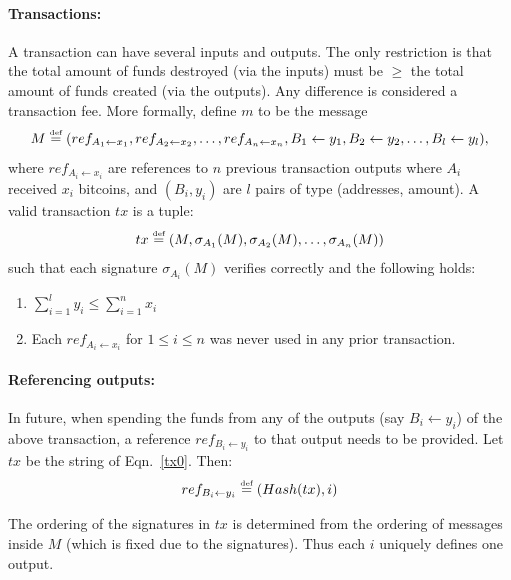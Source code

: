 \documentclass[]{report}   %
\newcommand{\sr}{\stackrel}
\newcommand{\ra}{\rightarrow}
\newcommand{\la}{\leftarrow}
\newcommand{\defined}{\stackrel{\mbox{\tiny{def}}}{=}}
\begin{document}
 
\paragraph{Transactions:} A transaction can have several inputs and outputs. The only restriction is that the total amount of funds destroyed (via the inputs) must be $\geq$ the total amount of funds created (via the outputs). Any difference is considered a transaction fee. More formally, define $m$ to be the message
\[
M \defined (ref_{A_1\leftarrow x_1}, ref_{A_2\leftarrow x_2}, \ldots, ref_{A_n\leftarrow x_n}, B_1\la y_1,
B_2\la y_2, \ldots, B_l\la y_l), 
\] 
where $ref_{A_i\leftarrow x_i}$ are references to $n$ previous transaction outputs where $A_i$ received $x_i$ bitcoins, and $(B_i, y_i)$ are $l$ pairs of type (addresses, amount). 
A valid transaction $tx$ is a tuple: 
\begin{equation}\label{tx0}tx\defined (M, \sigma_{A_1}(M), \sigma_{A_2}(M), \ldots, \sigma_{A_n}(M))\end{equation} such that each signature $\sigma_{A_i}(M)$ verifies correctly and the following holds:
\begin{enumerate}
	\item $\sum_{i=1}^{l}y_i \leq \sum_{i=1}^{n}x_i$ 
	\item Each $ref_{A_i \leftarrow x_i}$ for $1\leq i\leq n$ was never used in any prior transaction.
\end{enumerate}


\paragraph{Referencing outputs:} In future, when spending the funds from any of the outputs (say $B_i \la y_i$) of the above transaction, a reference $ref_{B_i \leftarrow y_i}$ to that output needs to be provided. %
Let $tx$ be the string of Eqn.~\ref{tx0}. Then: \[ref_{B_i \leftarrow y_i}\defined (Hash(tx), i)\]

The ordering of the signatures in $tx$ is determined from the ordering of messages inside $M$ (which is fixed due to the signatures). Thus each $i$ uniquely defines one output.
\end{document}
